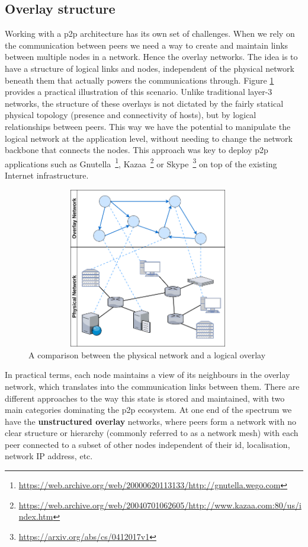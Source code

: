 \subsection{Overlay structure}\label{overlay-structure}

Working with a \acrshort{p2p} architecture has its own set of challenges. When
we rely on the communication between peers we need a way to create and maintain
links between multiple nodes in a network. Hence the overlay networks. The idea
is to have a structure of logical links and nodes, independent of the physical
network beneath them that actually powers the communications through. Figure
\ref{fig:overlay-vs-physical} provides a practical illustration of this
scenario. Unlike traditional layer-3 networks, the structure of these overlays
is not dictated by the fairly statical physical topology (presence and
connectivity of hosts), but by logical relationships between peers. This way we
have the potential to manipulate the logical network at the application level,
without needing to change the network backbone that connects the nodes. This
approach was key to deploy \acrshort{p2p} applications such as
Gnutella~\footnote{\url{https://web.archive.org/web/20000620113133/http://gnutella.wego.com}},
Kazaa~\footnote{\url{https://web.archive.org/web/20040701062605/http://www.kazaa.com:80/us/index.htm}}
or Skype~\footnote{\url{https://arxiv.org/abs/cs/0412017v1}} on top of the
existing Internet infrastructure.

\begin{figure}[hb!]
  \centering
  \includegraphics[max height=7cm,max width=0.95\textwidth]{img/overlay-vs-physical.png}
  \caption{A comparison between the physical network and a logical overlay}
  \label{fig:overlay-vs-physical}
\end{figure}

In practical terms, each node maintains a view of its neighbours in the overlay
network, which translates into the communication links between them. There are
different approaches to the way this state is stored and maintained, with two
main categories dominating the \acrshort{p2p} ecosystem. At one end of the
spectrum we have the \textbf{unstructured overlay} networks, where peers form a
network with no clear structure or hierarchy (commonly referred to as a network
mesh) with each peer connected to a subset of other nodes independent of their
\acrfull{id}, localisation, network IP address, etc.
\bigskip

